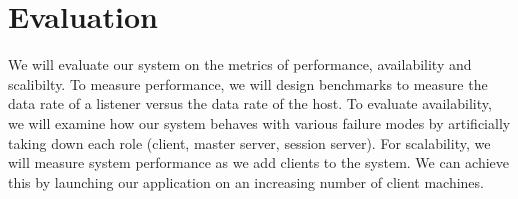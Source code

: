 \section{Evaluation}
\label{sec:eval}
We will evaluate our system on the metrics of performance, 
availability and scalibilty. To measure performance, 
we will design benchmarks to measure the data rate 
of a listener versus the data rate of the host. To 
evaluate availability, we will examine how our system 
behaves with various failure modes by artificially 
taking down each role (client, master server, session 
server). For scalability, we will measure system 
performance as we add clients to the system. We can 
achieve this by launching our application on an 
increasing number of client machines.
